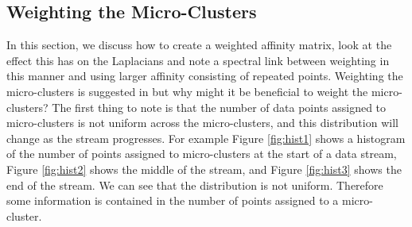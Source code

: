 \subsection{Weighting the Micro-Clusters}
\label{sec:weighting}

In this section, we discuss how to create a weighted affinity matrix, look at the effect this has on the Laplacians and note a spectral link between weighting in this manner and using larger affinity consisting of repeated points.
Weighting the micro-clusters is suggested in \cite{Zhang1996a} but why might it be beneficial to weight the micro-clusters?  The first thing to note is that the number of data points assigned to micro-clusters is not uniform across the micro-clusters, and this distribution will change as the stream progresses.  For example Figure \ref{fig:hist1} shows a histogram of the number of points assigned to micro-clusters at the start of a data stream, Figure \ref{fig:hist2} shows the middle of the stream, and Figure \ref{fig:hist3} shows the end of the stream. We can see that the distribution is not uniform. Therefore some information is contained in the number of points assigned to a micro-cluster. 

